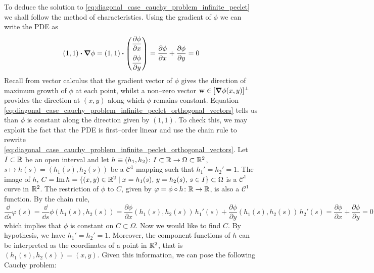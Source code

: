 To deduce the solution to \eqref{eq:diagonal_case_cauchy_problem_infinite_peclet} we shall follow the method of characteristics. Using the gradient of $\phi$ we can write the PDE as
\begin{equation} \label{eq:diagonal_case_cauchy_problem_infinite_peclet_orthogonal_vectors}
	\left( 1, 1 \right)
	\vdot
	\grad{\phi} = 
	\left( 1, 1 \right)
	\vdot
	\begin{pmatrix}
	\displaystyle\pdv{\phi}{x} \\[10pt] \displaystyle\pdv{\phi}{y}
	\end{pmatrix} = 
	\pdv{\phi}{x} + \pdv{\phi}{y} = 0
\end{equation}
Recall from vector calculus that the gradient vector of $\phi$ gives the direction of maximum growth of $\phi$ at each point, whilst a non--zero vector $\vb{w} \in [\grad{\phi}(x,y)]^\perp$ provides the direction at $(x,y)$ along which $\phi$ remains constant. Equation \eqref{eq:diagonal_case_cauchy_problem_infinite_peclet_orthogonal_vectors} tells us than $\phi$ is constant along the direction given by $(1, 1)$. To check this, we may exploit the fact that the PDE is first--order linear and use the chain rule to rewrite \eqref{eq:diagonal_case_cauchy_problem_infinite_peclet_orthogonal_vectors}. Let $I \subset \mathbb{R}$ be an open interval and let $h \equiv (h_1, h_2) \colon I \subset \mathbb{R} \rightarrow \Omega \subset \mathbb{R}^2$, $s \mapsto h(s) = (h_1(s), h_2(s))$ be a $\mathcal{C}^1$ mapping such that $h_1' = h_2' = 1$. The image of $h$, $C = \operatorname{Im}{h} = \{ (x, y) \in \mathbb{R}^2 \mid x = h_1(s), \, y = h_2(s), \, s \in I \} \subset \Omega$ is a $\mathcal{C}^1$ curve in $\mathbb{R}^2$. The restriction of $\phi$ to  $C$, given by $\varphi = \phi \circ h \colon \mathbb{R} \rightarrow \mathbb{R}$, is also a $\mathcal{C}^1$ function. By the chain rule,
\begin{equation} \label{eq:diagonal_case_cauchy_problem_infinite_peclet_chain_rule}
	\frac{\dd}{\dd{s}} \varphi(s) = 
	\frac{\dd}{\dd{s}} \phi(h_1(s), h_2(s)) = 
	\frac{\partial \phi}{\partial x} (h_1(s), h_2(s)) \, h_1'(s) + 
	\frac{\partial \phi}{\partial y} (h_1(s), h_2(s)) \, h_2'(s) =
	\frac{\partial \phi}{\partial x} + \frac{\partial \phi}{\partial y} = 0
\end{equation}
which implies that $\phi$ is constant on $C \subset \Omega$. Now we would like to find $C$. By hypothesis, we have $h_1' = h_2' = 1$. Moreover, the component functions of $h$ can be interpreted as the coordinates of a point in $\mathbb{R}^2$, that is $(h_1(s), h_2(s)) = (x, y)$. Given this information, we can pose the following Cauchy problem:
